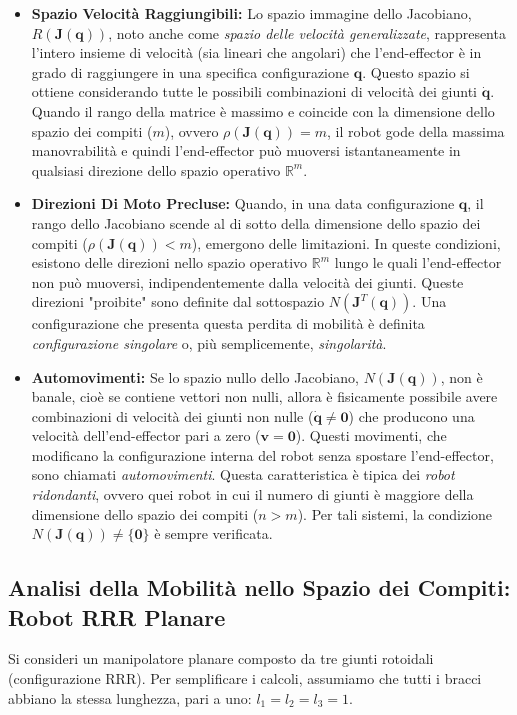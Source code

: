 ﻿\documentclass[11pt, a4paper]{article}
\begin{document}
\begin{itemize}
    \item \textbf{Spazio Velocità Raggiungibili:} Lo spazio immagine dello Jacobiano, $R(\bm{J}(\bm{q}))$, noto anche come \textit{spazio delle velocità generalizzate}, rappresenta l'intero insieme di velocità (sia lineari che angolari) che l'end-effector è in grado di raggiungere in una specifica configurazione $\bm{q}$. Questo spazio si ottiene considerando tutte le possibili combinazioni di velocità dei giunti $\dot{\bm{q}}$. Quando il rango della matrice è massimo e coincide con la dimensione dello spazio dei compiti ($m$), ovvero $\rho(\bm{J}(\bm{q})) = m$, il robot gode della massima manovrabilità e quindi l'end-effector può muoversi istantaneamente in qualsiasi direzione dello spazio operativo $\mathbb{R}^{m}$.

    \item \textbf{Direzioni Di Moto Precluse:} Quando, in una data configurazione $\bm{q}$, il rango dello Jacobiano scende al di sotto della dimensione dello spazio dei compiti ($\rho(\bm{J}(\bm{q})) < m$), emergono delle limitazioni. In queste condizioni, esistono delle direzioni nello spazio operativo $\mathbb{R}^{m}$ lungo le quali l'end-effector non può muoversi, indipendentemente dalla velocità dei giunti. Queste direzioni "proibite" sono definite dal sottospazio $N(\bm{J}^T(\bm{q}))$. Una configurazione che presenta questa perdita di mobilità è definita \textit{configurazione singolare} o, più semplicemente, \textit{singolarità}.

    \item \textbf{Automovimenti:} Se lo spazio nullo dello Jacobiano, $N(\bm{J}(\bm{q}))$, non è banale, cioè se contiene vettori non nulli, allora è fisicamente possibile avere combinazioni di velocità dei giunti non nulle ($\dot{\bm{q}} \neq \bm{0}$) che producono una velocità dell'end-effector pari a zero ($\bm{v} = \bm{0}$). Questi movimenti, che modificano la configurazione interna del robot senza spostare l'end-effector, sono chiamati \textit{automovimenti}. Questa caratteristica è tipica dei \textit{robot ridondanti}, ovvero quei robot in cui il numero di giunti è maggiore della dimensione dello spazio dei compiti ($n > m$). Per tali sistemi, la condizione $N(\bm{J}(\bm{q})) \neq \{\bm{0}\}$ è sempre verificata.
\end{itemize}

\newpage
\subsection{Analisi della Mobilità nello Spazio dei Compiti: Robot RRR Planare}
Si consideri un manipolatore planare composto da tre giunti rotoidali (configurazione RRR). Per semplificare i calcoli, assumiamo che tutti i bracci abbiano la stessa lunghezza, pari a uno: $l_1 = l_2 = l_3 = 1$.
\end{document}
